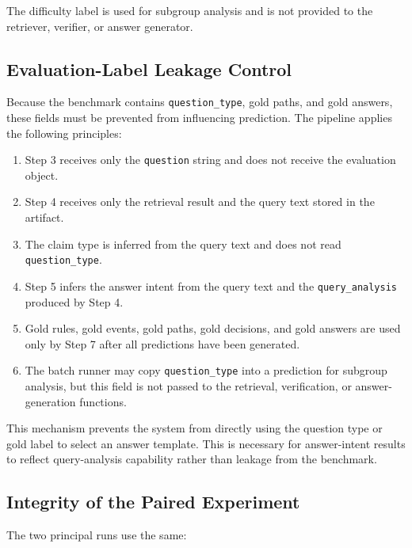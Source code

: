 The difficulty label is used for subgroup analysis and is not provided to the
retriever, verifier, or answer generator.

\subsection{Evaluation-Label Leakage Control}

Because the benchmark contains \texttt{question\_type}, gold paths, and gold
answers, these fields must be prevented from influencing prediction. The
pipeline applies the following principles:

\begin{enumerate}
    \item Step 3 receives only the \texttt{question} string and does not
    receive the evaluation object.

    \item Step 4 receives only the retrieval result and the query text stored
    in the artifact.

    \item The claim type is inferred from the query text and does not read
    \texttt{question\_type}.

    \item Step 5 infers the answer intent from the query text and the
    \texttt{query\_analysis} produced by Step 4.

    \item Gold rules, gold events, gold paths, gold decisions, and gold answers
    are used only by Step 7 after all predictions have been generated.

    \item The batch runner may copy \texttt{question\_type} into a prediction
    for subgroup analysis, but this field is not passed to the retrieval,
    verification, or answer-generation functions.
\end{enumerate}

This mechanism prevents the system from directly using the question type or
gold label to select an answer template. This is necessary for answer-intent
results to reflect query-analysis capability rather than leakage from the
benchmark.

\subsection{Integrity of the Paired Experiment}

The two principal runs use the same:

